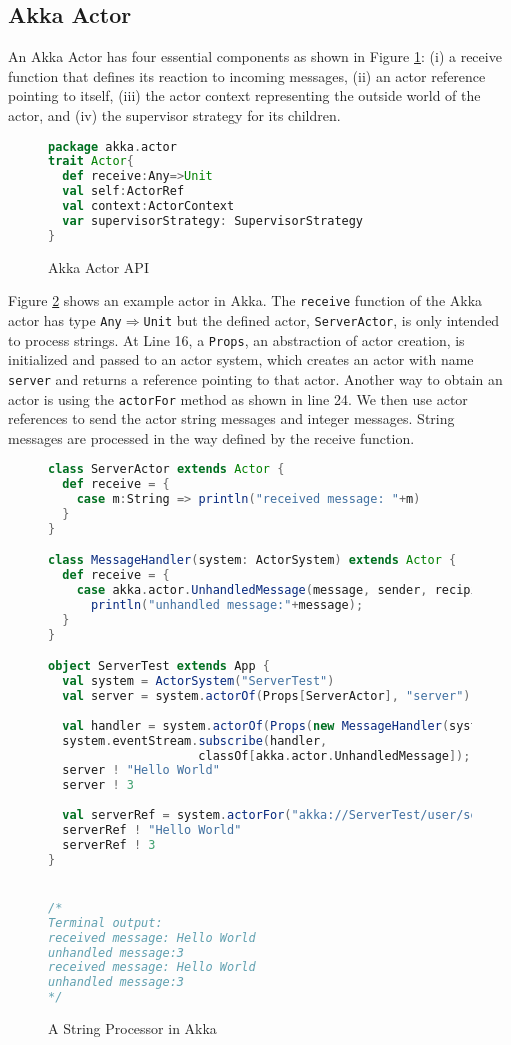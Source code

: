 \subsection{Akka Actor}
\label{akka actor}


An Akka Actor has four essential components as shown in Figure 
\ref{fig:akka_actor_api}: (i) a receive function that defines its reaction to 
incoming messages, (ii) an actor reference pointing to  itself, (iii) the actor 
 context representing the outside world of the actor, and (iv) the supervisor 
strategy for its children.

\begin{figure}[h]
\label{fig:akka_actor_api}
\begin{lstlisting}[language=scala]
package akka.actor
trait Actor{
  def receive:Any=>Unit
  val self:ActorRef
  val context:ActorContext
  var supervisorStrategy: SupervisorStrategy
}
\end{lstlisting}
\caption{Akka Actor API}
\end{figure}

Figure \ref{akkastring} shows an example actor in Akka.  The {\tt receive} 
function of the Akka actor has type {\tt Any$\Rightarrow$Unit} but the 
defined actor, {\tt ServerActor}, is only intended to process strings.  At Line 
16, a {\tt Props}, an abstraction of actor creation, is initialized and passed 
to an actor system, which creates an actor with name \textcolor{mauve}{\tt 
server} and returns a reference pointing to that actor.  Another way to obtain 
an actor is using the {\tt actorFor} method as shown in line 24.  We then use 
actor references to send the actor string messages and integer messages.  
String messages are processed in the way defined by the receive function.

\begin{figure}[t]
 \label{akkastring}
      \begin{lstlisting}[language=scala]
class ServerActor extends Actor {
  def receive = {
    case m:String => println("received message: "+m)
  }
}

class MessageHandler(system: ActorSystem) extends Actor {
  def receive = {
    case akka.actor.UnhandledMessage(message, sender, recipient) =>
      println("unhandled message:"+message);
  }
}

object ServerTest extends App {
  val system = ActorSystem("ServerTest")
  val server = system.actorOf(Props[ServerActor], "server")
  
  val handler = system.actorOf(Props(new MessageHandler(system)))
  system.eventStream.subscribe(handler,
                     classOf[akka.actor.UnhandledMessage]);
  server ! "Hello World"
  server ! 3
  
  val serverRef = system.actorFor("akka://ServerTest/user/server")
  serverRef ! "Hello World"
  serverRef ! 3
}


/*
Terminal output:
received message: Hello World
unhandled message:3
received message: Hello World
unhandled message:3
*/
    \end{lstlisting}
    \caption{A String Processor in Akka}
\end{figure}

